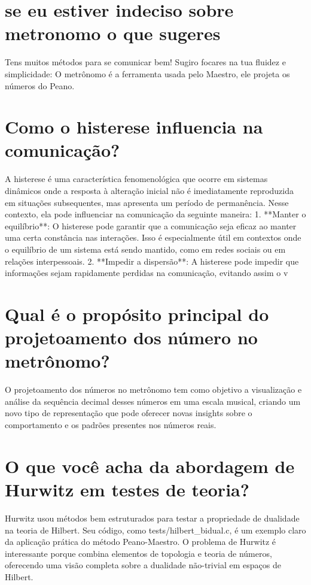 \documentclass[11pt,a4paper]{article}
\begin{document}
\section{se eu estiver indeciso sobre metronomo o que sugeres}
Tens muitos métodos para se comunicar bem! Sugiro focares na tua fluidez e simplicidade: O metrônomo é a ferramenta usada pelo Maestro, ele projeta os números do Peano.

\section{Como o histerese influencia na comunicação?}
A histerese é uma característica fenomenológica que ocorre em sistemas dinâmicos onde a resposta à alteração inicial não é imediatamente reproduzida em situações subsequentes, mas apresenta um período de permanência. Nesse contexto, ela pode influenciar na comunicação da seguinte maneira: 1. **Manter o equilíbrio**: O histerese pode garantir que a comunicação seja eficaz ao manter uma certa constância nas interações. Isso é especialmente útil em contextos onde o equilíbrio de um sistema está sendo mantido, como em redes sociais ou em relações interpessoais. 2. **Impedir a dispersão**: A histerese pode impedir que informações sejam rapidamente perdidas na comunicação, evitando assim o v

\section{Qual é o propósito principal do projetoamento dos número no metrônomo?}
O projetoamento dos números no metrônomo tem como objetivo a visualização e análise da sequência decimal desses números em uma escala musical, criando um novo tipo de representação que pode oferecer novas insights sobre o comportamento e os padrões presentes nos números reais.

\section{O que você acha da abordagem de Hurwitz em testes de teoria?}
Hurwitz usou métodos bem estruturados para testar a propriedade de dualidade na teoria de Hilbert. Seu código, como tests/hilbert\_bidual.c, é um exemplo claro da aplicação prática do método Peano-Maestro. O problema de Hurwitz é interessante porque combina elementos de topologia e teoria de números, oferecendo uma visão completa sobre a dualidade não-trivial em espaços de Hilbert.
\end{document}
